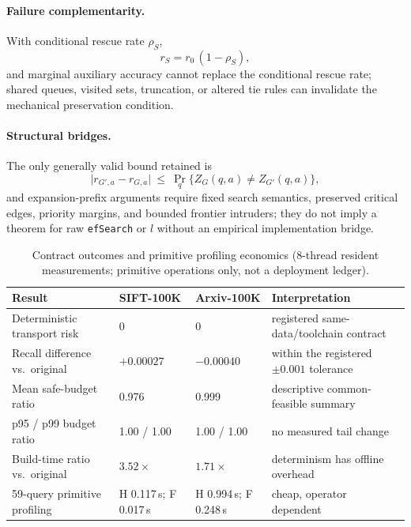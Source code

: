 \documentclass{article}
\renewcommand{\Pr}{\mathop{\mathrm{Pr}}}   %
\begin{document}
\paragraph{Failure complementarity.} With conditional rescue rate $\rho_S$,
\begin{equation}
r_{S}=r_{0}\,(1-\rho_{S}),
\label{eq:rescue}
\end{equation}
and marginal auxiliary accuracy cannot replace the conditional rescue rate; shared queues, visited sets,
truncation, or altered tie rules can invalidate the mechanical preservation condition.

\paragraph{Structural bridges.} The only generally valid bound retained is
\begin{equation}
\bigl|r_{G',a}-r_{G,a}\bigr|\ \le\ \Pr_{q}\{Z_{G}(q,a)\neq Z_{G'}(q,a)\},
\label{eq:bridge}
\end{equation}
and expansion-prefix arguments require fixed search semantics, preserved critical edges, priority margins,
and bounded frontier intruders; they do not imply a theorem for raw \texttt{efSearch} or $l$ without an
empirical implementation bridge.

\begin{table}[t]
\centering
\caption{Contract outcomes and primitive profiling economics (8-thread resident measurements; primitive
operations only, not a deployment ledger).}
\label{tab:contract}
\footnotesize
\setlength{\tabcolsep}{3.5pt}
\begin{tabular}{p{3.7cm}llp{4.2cm}}
\toprule
Result & SIFT-100K & Arxiv-100K & Interpretation \\
\midrule
Deterministic transport risk & 0 & 0 & registered same-data/toolchain contract \\
Recall difference vs.\ original & $+0.00027$ & $-0.00040$ & within the registered $\pm0.001$ tolerance \\
Mean safe-budget ratio & 0.976 & 0.999 & descriptive common-feasible summary \\
p95 / p99 budget ratio & 1.00 / 1.00 & 1.00 / 1.00 & no measured tail change \\
Build-time ratio vs.\ original & $3.52\times$ & $1.71\times$ & determinism has offline overhead \\
59-query primitive profiling & H 0.117\,s; F 0.017\,s & H 0.994\,s; F 0.248\,s & cheap, operator dependent \\
\bottomrule
\end{tabular}
\end{table}
\end{document}
